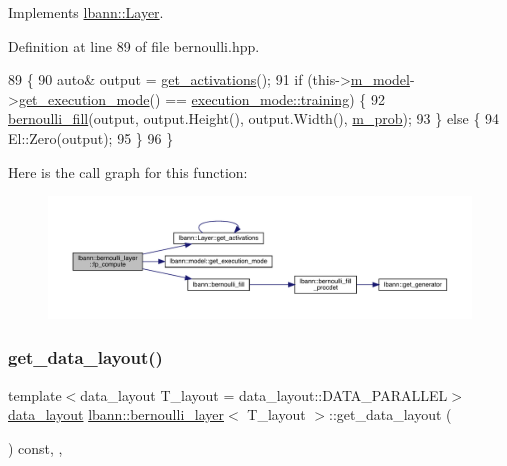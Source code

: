 Implements \hyperlink{classlbann_1_1Layer_a523319dd1bd87a0612afa1912bb5aad7}{lbann\+::\+Layer}.



Definition at line 89 of file bernoulli.\+hpp.


\begin{DoxyCode}
89                              \{
90     \textcolor{keyword}{auto}& output = \hyperlink{classlbann_1_1Layer_a1134b1a4385af199d7272c5aa827fa99}{get\_activations}();
91     \textcolor{keywordflow}{if} (this->\hyperlink{classlbann_1_1Layer_a3d9315e99574166f2f33e37b572021d2}{m\_model}->\hyperlink{classlbann_1_1model_addb40597cf29aa6d31b6a7d09ef48608}{get\_execution\_mode}() == 
      \hyperlink{base_8hpp_a2781a159088df64ed7d47cc91c4dc0a8ac185ddac8b5a8f5aa23c5b80bc12d214}{execution\_mode::training}) \{
92       \hyperlink{namespacelbann_ae8bc674a3d676391666524b44cbc4068}{bernoulli\_fill}(output, output.Height(), output.Width(), 
      \hyperlink{classlbann_1_1bernoulli__layer_a4f4b68b455233b5e4c5c6f992289669c}{m\_prob});
93     \} \textcolor{keywordflow}{else} \{
94       El::Zero(output);
95     \}
96   \}
\end{DoxyCode}
Here is the call graph for this function\+:\nopagebreak
\begin{figure}[H]
\begin{center}
\leavevmode
\includegraphics[width=350pt]{classlbann_1_1bernoulli__layer_ad3b8939b6df375880247ef54f370ceb1_cgraph}
\end{center}
\end{figure}
\mbox{\label{classlbann_1_1bernoulli__layer_aad1be2449edaa224b44bb6cef47599e9}} 
\subsubsection{\texorpdfstring{get\+\_\+data\+\_\+layout()}{get\_data\_layout()}}
{\footnotesize\ttfamily template$<$data\+\_\+layout T\+\_\+layout = data\+\_\+layout\+::\+D\+A\+T\+A\+\_\+\+P\+A\+R\+A\+L\+L\+EL$>$ \\
\hyperlink{base_8hpp_a786677cbfb3f5677b4d84f3056eb08db}{data\+\_\+layout} \hyperlink{classlbann_1_1bernoulli__layer}{lbann\+::bernoulli\+\_\+layer}$<$ T\+\_\+layout $>$\+::get\+\_\+data\+\_\+layout (\begin{DoxyParamCaption}{ }\end{DoxyParamCaption}) const\hspace{0.3cm}{\ttfamily [inline]}, {\ttfamily [override]}, {\ttfamily [virtual]}}

